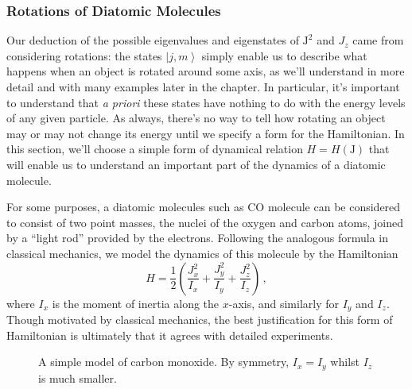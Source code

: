 \documentclass{article}
\theoremstyle{plain}\theoremheaderfont{\normalfont\itshape}\theorembodyfont{\rmfamily}\theoremseparator{.}\newtheorem*{rem}{Remark}\newtheorem*{ex}{Example}\newtheorem*{proof}{Proof}\newtheorem*{altp}{Alternative proof}
\theoremstyle{plain}\theoremheaderfont{\normalfont\bfseries}\theorembodyfont{\rmfamily}\theoremseparator{.}\newtheorem{thm}{Theorem}[section]\newtheorem{lem}[thm]{Lemma}\newtheorem{prop}[thm]{Proposition}\newtheorem*{cor}{Corollary}\newtheorem{defn}[thm]{Definition}\newtheorem{clm}[thm]{Claim}\newtheorem{clminproof}{Claim}
\theoremstyle{break}\theoremheaderfont{\normalfont\itshape}\theorembodyfont{\rmfamily}\theoremseparator{.\medskip}\newtheorem*{proofskip}{Proof}\newtheorem*{exs}{Examples}\newtheorem*{rems}{Remarks}
\theoremstyle{break}\theoremheaderfont{\normalfont\bfseries}\theorembodyfont{\rmfamily}\theoremseparator{.\medskip}\newtheorem{lemskip}[thm]{Lemma}\newtheorem{defnskip}[thm]{Definition}\newtheorem{propskip}[thm]{Proposition}\newtheorem{thmskip}[thm]{Theorem}
\numberwithin{equation}{section}
\newcommand{\ket}[1]{\left| #1 \right\rangle}
\newcommand{\vb}[1]{\bm{\mathrm{#1}}}
\begin{document}
    \subsubsection{Rotations of Diatomic Molecules}
    Our deduction of the possible eigenvalues and eigenstates of \(\vb{J}^2\) and \(J_z\) came from considering rotations: the states \(\ket{j,m}\) simply enable us to describe what happens when an object is rotated around some axis, as we'll understand in more detail and with many examples later in the chapter. In particular, it's important to understand that \textit{a priori} these states have nothing to do with the energy levels of any given particle. As always, there's no way to tell how rotating an object may or may not change its energy until we specify a form for the Hamiltonian. In this section, we'll choose a simple form of dynamical relation \(H=H(\vb{J})\) that will enable us to understand an important part of the dynamics of a diatomic molecule.

    For some purposes, a diatomic molecules such as \(\mathrm{CO}\) molecule can be considered to consist of two point masses, the nuclei of the oxygen and carbon atoms, joined by a ``light rod'' provided by the electrons. Following the analogous formula in classical mechanics, we model the dynamics of this molecule by the Hamiltonian
    \begin{equation}
        H=\frac{1}{2}\left(\frac{J_x^2}{I_x}+\frac{J_y^2}{I_y}+\frac{J_z^2}{I_z}\right)\,,
    \end{equation}
    where \(I_x\) is the moment of inertia along the \(x\)-axis, and similarly for \(I_y\) and \(I_z\). Though motivated by classical mechanics, the best justification for this form of Hamiltonian is ultimately that it agrees with detailed experiments.

    \begin{figure}
        \centering
        \caption{A simple model of carbon monoxide. By symmetry, \(I_x=I_y\) whilst \(I_z\) is much smaller.}
    \end{figure}
\end{document}
